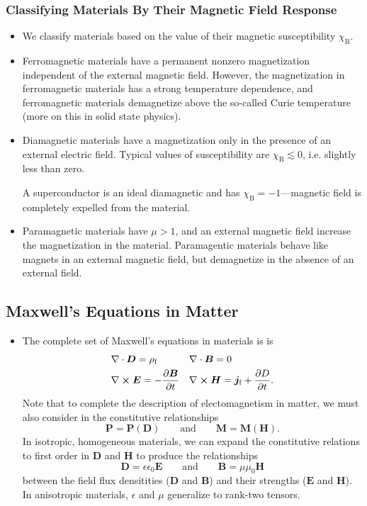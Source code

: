 \documentclass[11pt, a4paper]{article}
\renewcommand{\vec}[1]{\bm{#1}} %
\newcommand{\E}{\vec{E}} %
\newcommand{\D}{\vec{D}}  %
\newcommand{\B}{\vec{B}} %
\renewcommand{\H}{\vec{H}}  %
\renewcommand{\P}{\vec{P}}  %
\newcommand{\M}{\vec{M}}  %
\newcommand{\e}{\epsilon}
\newcommand{\ee}{\epsilon_{0}}  %
\newcommand{\mm}{\mu_{0}}  %
\renewcommand{\j}{\vec{j}}  %
\renewcommand{\div}{\nabla \cdot}
\renewcommand{\curl}{\nabla \cross}
\begin{document}
\subsubsection{Classifying Materials By Their Magnetic Field Response}
\begin{itemize}
	\item We classify materials based on the value of their magnetic susceptibility $ \chi_{\text{B}} $. 
	
	\item Ferromagnetic materials have a permanent nonzero magnetization independent of the external magnetic field. However, the magnetization in ferromagnetic materials has a strong temperature dependence, and ferromagnetic materials demagnetize above the so-called Curie temperature (more on this in solid state physics).
	
    \item Diamagnetic materials have a magnetization only in the presence of an external electric field. Typical values of susceptibility are $ \chi_{\text{B}} \lesssim 0 $, i.e. slightly less than zero.
	
	A superconductor is an ideal diamagnetic and has $ \chi_{\text{B}} = -1 $---magnetic field is completely expelled from the material.
	
	\item Paramagnetic materials have $ \mu > 1 $, and an external magnetic field increase the magnetization in the material. Paramagentic materials behave like magnets in an external magnetic field, but demagnetize in the absence of an external field. 
\end{itemize}

\subsection{Maxwell's Equations in Matter}
\begin{itemize}
	\item The complete set of Maxwell's equations in materials is is
	\begin{align*}
		& \div \D = \rho_{\text{f}} && \div \B = 0\\
		& \curl \E = - \pdv{\B}{t} &&  \curl \H = \j_{\text{f}} + \pdv{D}{t}.
	\end{align*}
	Note that to complete the description of electomagnetism in matter, we must also consider in the constitutive relationships
    \begin{equation*}
        \P = \P(\D) \qquad \text{and} \qquad \M = \M(\H).
    \end{equation*}
    In isotropic, homogeneous materials, we can expand the constitutive relations to first order in $ \D $ and $ \H $ to produce the relationships
    \begin{equation*}
        \D = \e \ee \E \qquad \text{and} \qquad \B = \mu \mm \H
    \end{equation*}
    between the field flux densitities ($ \D $ and $ \B $) and their strengths ($ \E $ and $ \H $).
	In anisotropic materials, $ \e $ and $ \mu $  generalize to rank-two tensors.
	
\end{itemize}
\end{document}
